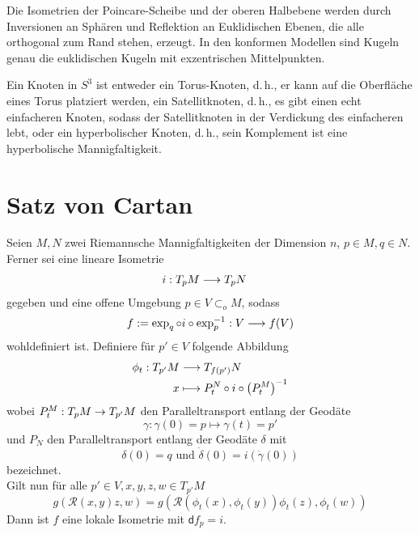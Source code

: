 \documentclass{book}
\renewcommand{\d}{\textsf{d}}
\newcommand{\Rc}{\mathcal{R}}
\begin{document}
\Prop{}
Die Isometrien der Poincare-Scheibe und der oberen Halbebene werden durch Inversionen an Sphären und Reflektion an Euklidischen Ebenen, die alle orthogonal zum Rand stehen, erzeugt.
\Prop{}
In den konformen Modellen sind Kugeln genau die euklidischen Kugeln mit exzentrischen Mittelpunkten.

Ein Knoten in $S^3$ ist entweder ein Torus-Knoten, d.\,h., er kann auf die Oberfläche eines Torus platziert werden, ein Satellitknoten, d.\,h., es gibt einen echt einfacheren Knoten, sodass der Satellitknoten in der Verdickung des einfacheren lebt, oder ein hyperbolischer Knoten, d.\,h., sein Komplement ist eine hyperbolische Mannigfaltigkeit.

\section{Satz von Cartan}
Seien $M,N$ zwei Riemannsche Mannigfaltigkeiten der Dimension $n$, $p \in M, q \in N$. Ferner sei eine lineare Isometrie
\begin{align*}
i : T_pM & \overset{}{\longrightarrow} T_pN
\end{align*}
gegeben und eine offene Umgebung $p \in V\subset_o M$, sodass
\begin{align*}
f:= \exp_q \circ i \circ \exp_p^{-1} : V \overset{}{\longrightarrow} f(V)
\end{align*}
wohldefiniert ist. Definiere für $p'\in V$ folgende Abbildung
\begin{align*}
\phi_{t} : T_{p'}M & \overset{}{\longrightarrow} T_{f(p')}N\\
x &\longmapsto P^N_t \circ i \circ \left(P^M_t\right)^{-1}
\end{align*}
wobei $P_t^M : T_pM \overset{}{\rightarrow} T_{p'}M$ den Paralleltransport entlang der Geodäte 
\[\gamma : \gamma(0) = p \mapsto \gamma(t) =  p'\]
und $P_N$ den Paralleltransport entlang der Geodäte $\delta$ mit
\[ \delta(0) = q \text{ und } \dot{\delta}(0) = i(\dot{\gamma}(0)) \]
bezeichnet.\\
Gilt nun für alle $p'\in V,x,y,z,w \in T_{p'}M$
\[ g(\Rc(x,y)z, w) = g(\Rc(\phi_{t}(x), \phi_{t}(y)) \phi_{t}(z),\phi_{t}(w)) \]
Dann ist $f$ eine lokale Isometrie mit $\d f_p = i$.
\end{document}
